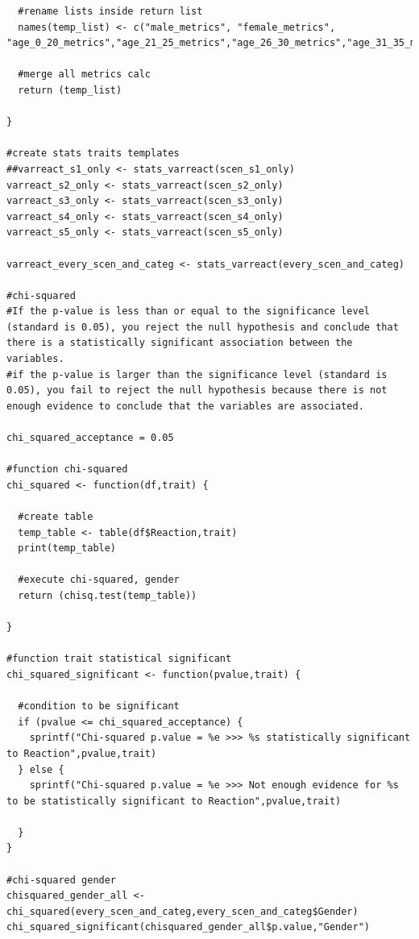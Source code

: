 \documentclass[a4paper]{article}
\begin{document}
\begin{lstlisting}
  #rename lists inside return list
  names(temp_list) <- c("male_metrics", "female_metrics", "age_0_20_metrics","age_21_25_metrics","age_26_30_metrics","age_31_35_metrics","age_36_40_metrics","age_41_45_metrics","age_46_50_metrics","age_51_55_metrics","age_56_60_metrics","age_61_99_metrics","categ_stud_metrics","categ_prof_metrics","categ_ta_metrics")
  
  #merge all metrics calc
  return (temp_list)
  
}

#create stats traits templates
##varreact_s1_only <- stats_varreact(scen_s1_only)
varreact_s2_only <- stats_varreact(scen_s2_only)
varreact_s3_only <- stats_varreact(scen_s3_only)
varreact_s4_only <- stats_varreact(scen_s4_only)
varreact_s5_only <- stats_varreact(scen_s5_only)

varreact_every_scen_and_categ <- stats_varreact(every_scen_and_categ)

#chi-squared
#If the p-value is less than or equal to the significance level (standard is 0.05), you reject the null hypothesis and conclude that there is a statistically significant association between the variables.
#if the p-value is larger than the significance level (standard is 0.05), you fail to reject the null hypothesis because there is not enough evidence to conclude that the variables are associated.

chi_squared_acceptance = 0.05

#function chi-squared
chi_squared <- function(df,trait) {
  
  #create table
  temp_table <- table(df$Reaction,trait)
  print(temp_table)
  
  #execute chi-squared, gender
  return (chisq.test(temp_table))
  
}

#function trait statistical significant
chi_squared_significant <- function(pvalue,trait) {
  
  #condition to be significant
  if (pvalue <= chi_squared_acceptance) {
    sprintf("Chi-squared p.value = %e >>> %s statistically significant to Reaction",pvalue,trait)
  } else {
    sprintf("Chi-squared p.value = %e >>> Not enough evidence for %s to be statistically significant to Reaction",pvalue,trait)
    
  }
}

#chi-squared gender
chisquared_gender_all <- chi_squared(every_scen_and_categ,every_scen_and_categ$Gender)
chi_squared_significant(chisquared_gender_all$p.value,"Gender")


\end{lstlisting}
\end{document}
